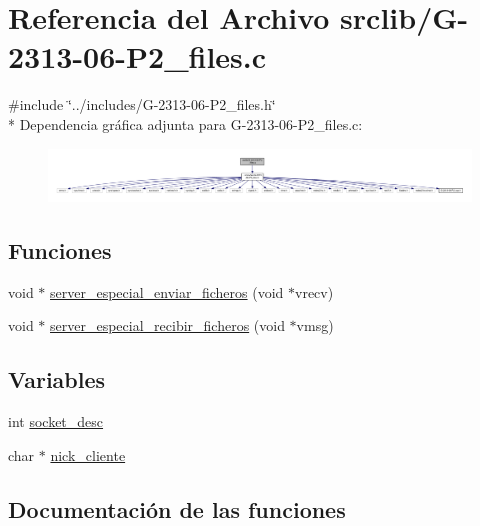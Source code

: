 \hypertarget{G-2313-06-P2__files_8c}{}\section{Referencia del Archivo srclib/\+G-\/2313-\/06-\/\+P2\+\_\+files.c}
\label{G-2313-06-P2__files_8c}
{\ttfamily \#include \char`\"{}../includes/\+G-\/2313-\/06-\/\+P2\+\_\+files.\+h\char`\"{}}\\*
Dependencia gráfica adjunta para G-\/2313-\/06-\/\+P2\+\_\+files.c\+:\nopagebreak
\begin{figure}[H]
\begin{center}
\leavevmode
\includegraphics[width=350pt]{G-2313-06-P2__files_8c__incl}
\end{center}
\end{figure}
\subsection*{Funciones}
\begin{DoxyCompactItemize}
\item 
void $\ast$ \hyperlink{G-2313-06-P2__files_8c_ad00af19306b45db3947f1b89ae4b5def}{server\+\_\+especial\+\_\+enviar\+\_\+ficheros} (void $\ast$vrecv)
\item 
void $\ast$ \hyperlink{G-2313-06-P2__files_8c_a6796f20636727f52161d02748cb2b17e}{server\+\_\+especial\+\_\+recibir\+\_\+ficheros} (void $\ast$vmsg)
\end{DoxyCompactItemize}
\subsection*{Variables}
\begin{DoxyCompactItemize}
\item 
int \hyperlink{G-2313-06-P2__files_8c_adeadf7cb6916a10c7142ce7d265ab32a}{socket\+\_\+desc}
\item 
char $\ast$ \hyperlink{G-2313-06-P2__files_8c_ab93a317ee9a27c82844c9128a76b136a}{nick\+\_\+cliente}
\end{DoxyCompactItemize}


\subsection{Documentación de las funciones}
